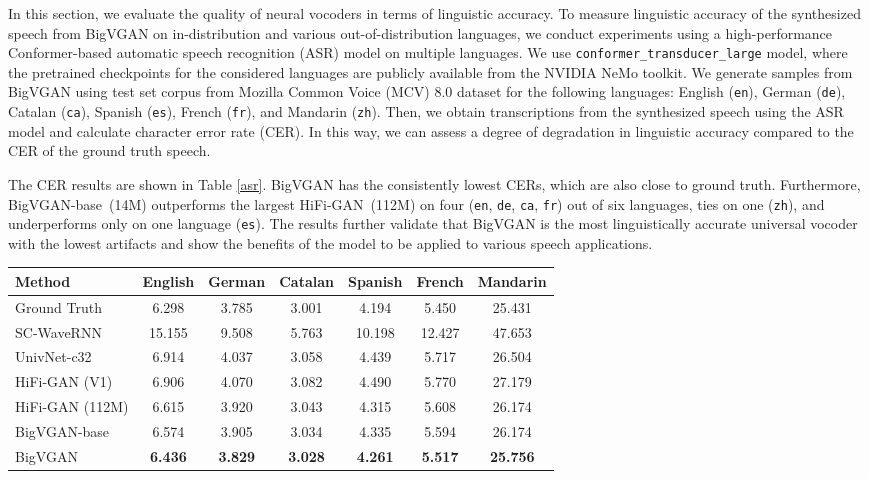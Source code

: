\documentclass{article} \usepackage{iclr2023_conference,times}
\theoremstyle{plain}
\theoremstyle{definition}
\theoremstyle{remark}
\begin{document}
In this section, we evaluate the quality of neural vocoders in terms of linguistic accuracy. To measure linguistic accuracy of the synthesized speech from BigVGAN on in-distribution and various out-of-distribution languages, we conduct experiments using a high-performance Conformer-based \citep{gulati2020conformer} automatic speech recognition (ASR) model on multiple languages. We use \texttt{conformer\_transducer\_large} model, where the pretrained checkpoints for the considered languages are publicly available from the NVIDIA NeMo \citep{kuchaiev2019nemo} toolkit. We generate samples from BigVGAN using test set corpus from Mozilla Common Voice (MCV) 8.0 dataset for the following languages: English (\texttt{en}), German (\texttt{de}), Catalan (\texttt{ca}), Spanish (\texttt{es}), French (\texttt{fr}), and Mandarin (\texttt{zh}). Then, we obtain transcriptions from the synthesized speech using the ASR model and calculate character error rate (CER). In this way, we can assess a degree of degradation in linguistic accuracy compared to the CER of the ground truth speech.

The CER results are shown in Table \ref{asr}. BigVGAN has the consistently lowest CERs, which are also close to ground truth. Furthermore, BigVGAN-base~(14M) outperforms the largest HiFi-GAN~(112M) on four (\texttt{en}, \texttt{de}, \texttt{ca}, \texttt{fr}) out of six languages, ties on one (\texttt{zh}), and underperforms only on one language (\texttt{es}). The results further validate that BigVGAN is the most linguistically accurate universal vocoder with the lowest artifacts and show the benefits of the model to be applied to various speech applications. 


\begin{table*}[t]
\caption{\footnotesize
Character error rates (CER) of synthesized speech on multiple languages.
}
\label{asr}
\vspace{-0.05cm}
\begin{center}
\begin{small}
\begin{tabular}{l|cccccc}
\toprule
Method & English & German & Catalan & Spanish & French & Mandarin \\
\midrule
Ground Truth & 6.298 & 3.785 & 3.001 & 4.194 & 5.450 & 25.431 \\
\midrule 
SC-WaveRNN & 15.155 & 9.508 & 5.763 & 10.198 & 12.427 & 47.653 \\
UnivNet-c32 & 6.914 & 4.037 & 3.058 & 4.439 & 5.717 & 26.504 \\
HiFi-GAN (V1) & 6.906 & 4.070 & 3.082 & 4.490 & 5.770 & 27.179 \\
HiFi-GAN (112M) & 6.615 & 3.920 & 3.043 & 4.315 & 5.608 & 26.174 \\
\midrule
BigVGAN-base  & 6.574 & 3.905 & 3.034 & 4.335 & 5.594 & 26.174 \\
BigVGAN  & \textbf{6.436} & \textbf{3.829} & \textbf{3.028} & \textbf{4.261} & \textbf{5.517} & \textbf{25.756} \\

\bottomrule
\end{tabular}
\end{small}
\end{center}
\vskip -0.1in
\end{table*}
\end{document}
